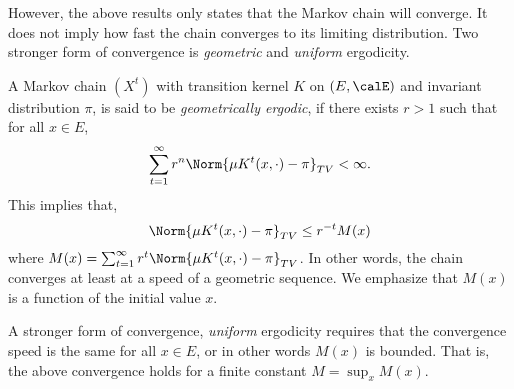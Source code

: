 However, the above results only states that the Markov chain will converge. It
does not imply how fast the chain converges to its limiting distribution. Two
stronger form of convergence is \emph{geometric} and \emph{uniform}
ergodicity.

A Markov chain $(X^t)$ with transition kernel $K$ on $(E,\calE)$ and invariant
distribution $\pi$, is said to be \emph{geometrically ergodic}, if there
exists $r > 1$ such that for all $x\in E$,
\begin{equation}
  \sum_{t=1}^{\infty} r^n\Norm{\mu K^t(x,\cdot)-\pi}_{TV} <\infty.
\end{equation}
This implies that,
\begin{equation}
  \Norm{\mu K^t(x,\cdot)-\pi}_{TV}\le r^{-t}M(x)
\end{equation}
where $M(x) = \sum_{t=1}^{\infty} r^t\Norm{\mu K^t(x,\cdot)-\pi}_{TV}$. In
other words, the chain converges at least at a speed of a geometric sequence.
We emphasize that $M(x)$ is a function of the initial value $x$.

A stronger form of convergence, \emph{uniform} ergodicity requires that the
convergence speed is the same for all $x\in E$, or in other words $M(x)$ is
bounded. That is, the above convergence holds for a finite constant $M =
\sup_x M(x)$.